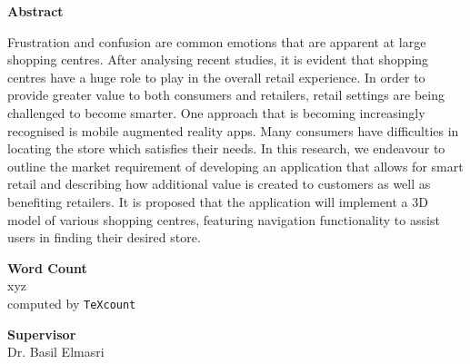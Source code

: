 \documentclass[12pt]{report}
\newcommand\blankpage{%
    \null
    \thispagestyle{empty}%
    \addtocounter{page}{-1}%
    \newpage}
\begin{document}
\begin{center}        
    \large
    \textbf{Abstract}\\
\end{center}

Frustration and confusion are common emotions that are apparent at large shopping centres. After analysing recent studies, it is evident that shopping centres have a huge role to play in the overall retail experience. In order to provide greater value to both consumers and retailers, retail settings are being challenged to become smarter. One approach that is becoming increasingly recognised is mobile augmented reality apps. Many consumers have difficulties in locating the store which satisfies their needs. In this research, we endeavour to outline the market requirement of developing an application that allows for smart retail and describing how additional value is created to customers as well as benefiting retailers. It is proposed that the application will implement a 3D model of various shopping centres, featuring navigation functionality to assist users in finding their desired store.\\

\vspace*{1.5cm}
\begin{center}    
    \large
    \textbf{Word Count}\\
    xyz\\
    \normalsize computed by \texttt{TeXcount}
\end{center}

\vspace*{1.5cm}
\begin{center}    
    \large
    \textbf{Supervisor}\\
    \normalsize Dr. Basil Elmasri
\end{center}

\afterpage{\blankpage}


\setcounter{tocdepth}{0}
\tableofcontents

\setcounter{tocdepth}{1}
\listoffigures


\printnomenclature[1in]

\afterpage{\blankpage}

\end{document}
